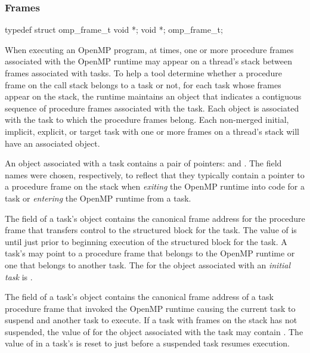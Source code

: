 \subsubsection{Frames}
\label{sec:omp_frame_t}


\begin{ccppspecific}
\begin{ompSyntax}
typedef struct omp_frame_t {
  void *;
  void *;
} omp_frame_t;
\end{ompSyntax}
\end{ccppspecific}


\descr

When executing an OpenMP program, at times, one or more procedure frames associated with
the OpenMP runtime may appear on a thread's stack between frames
associated with tasks. To help a tool determine whether a procedure
frame on the call stack belongs to a task or not,
for each task whose frames appear on the stack, the runtime
maintains an  object
that indicates a contiguous sequence of
procedure frames associated with the task.
Each  object is associated with the task to which the procedure frames belong.
Each non-merged initial, implicit, explicit, or target task with one or more frames on a thread's stack
will have an associated  object.



An  object associated with a task contains a pair
of pointers:  and . The field names were
chosen, respectively, to reflect that they typically contain a pointer to a procedure frame on the stack when
\emph{exiting} the OpenMP runtime into code for a task or \emph{entering} the OpenMP runtime from a task.

The  field of a task's  object
contains the canonical frame address for the procedure frame that
transfers control to the structured block for the task.
The value of  is  until just prior to
beginning execution of the structured block for the task.
A task's  may point to a procedure frame that belongs
to the OpenMP runtime or one that belongs to another task.
The  for the  object associated
with an \emph{initial task} is .

The  field of a task's  object
contains the canonical frame address of a task procedure frame that invoked the
OpenMP runtime causing the current task to suspend and another task to
execute.
If a task with frames on the stack has not suspended, the value of
 for the  object
associated with the task may contain .
The value of  in a task's  is
reset to  just before a suspended task resumes execution.

